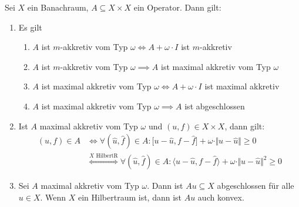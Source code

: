 \begin{lemma}
	Sei $X$ ein Banachraum, $A\subseteq X\times X$ ein Operator. 
	Dann gilt:
	\begin{enumerate}[label=(\alph*)]
		\item Es gilt %
		\begin{enumerate}[label=(\roman*)]
			\item $A$ ist $m$-akkretiv vom Typ $\omega\Longleftrightarrow A+\omega\cdot I$ ist $m$-akkretiv
			\item $A$ ist $m$-akkretiv vom Typ $\omega\implies A$ ist maximal akkretiv vom Typ $\omega$
			\item $A$ ist maximal akkretiv vom Typ $\omega\Longleftrightarrow A+\omega\cdot I$ ist maximal akkretiv
			\item $A$ ist maximal akkretiv vom Typ $\omega\implies A$ ist abgeschlossen
		\end{enumerate}
 		\item Ist $A$ maximal akkretiv vom Typ $\omega$ und $(u,f)\in X\times X$, dann gilt:
 		\begin{align*}
 			(u,f)\in A&\Longleftrightarrow\forall(\hat{u},\hat{f})\in A:\big[u-\hat{u},f-\hat{f}\big]+\omega\cdot\Vert u-\hat{u}\Vert\geq0\\
 			&\stackrel{X\text{ HilbertR}}{\Longleftrightarrow}
 			\forall(\hat{u},\hat{f})\in A:\big\langle u-\hat{u},f-\hat{f}\big\rangle+\omega\cdot\Vert u-\hat{u}\Vert^2\geq0
 		\end{align*}
 		\item Sei $A$ maximal akkretiv vom Typ $\omega$. 
 		Dann ist $Au\subseteq X$ abgeschlossen für alle $u\in X$. 
 		Wenn $X$ ein Hilbertraum ist, dann ist $Au$ auch konvex.
	\end{enumerate}
\end{lemma}

